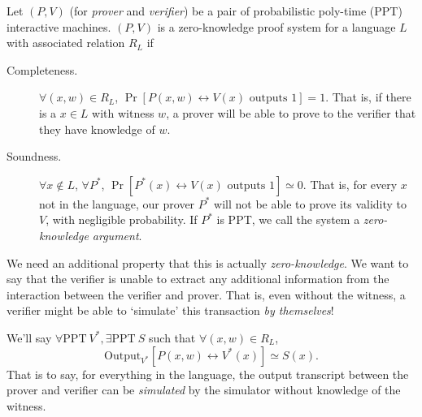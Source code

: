 \begin{definition}
    Let $(P, V)$ (for \emph{prover} and \emph{verifier}) be a pair of probabilistic poly-time (PPT) interactive machines. $(P, V)$ is a zero-knowledge proof system for a language $L$ with associated relation $R_L$ if
    \begin{description}
        \item[Completeness.] $\forall (x, w)\in R_L$, $\Pr[P(x, w) \leftrightarrow V(x) \text{ outputs }1] = 1$. That is, if there is a $x\in L$ with witness $w$, a prover will be able to prove to the verifier that they have knowledge of $w$.
        \item[Soundness.] $\forall x\not\in L$, $\forall P^*$, $\Pr[P^*(x) \leftrightarrow V(x)\text{ outputs }1]\simeq 0$. That is, for every $x$ not in the language, our prover $P^*$ will not be able to prove its validity to $V$, with negligible probability. If $P^*$ is PPT, we call the system a \emph{zero-knowledge argument}.
    \end{description}
    We need an additional property that this is actually \emph{zero-knowledge}. We want to say that the verifier is unable to extract any additional information from the interaction between the verifier and prover. That is, even without the witness, a verifier might be able to `simulate' this transaction \emph{by themselves}!

    We'll say $\forall \mathrm{PPT}\ V^*, \exists \mathrm{PPT}\ S$ such that $\forall (x, w)\in R_L$,
    \[\mathrm{Output}_{V^*}[P(x, w)\leftrightarrow V^*(x)]\simeq S(x).\]
    That is to say, for everything in the language, the output transcript between the prover and verifier can be \emph{simulated} by the simulator without knowledge of the witness.
\end{definition}

